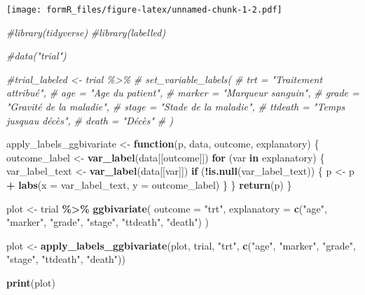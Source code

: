 \documentclass[
]{article}
\newenvironment{Shaded}{\begin{snugshade}}{\end{snugshade}}
\newcommand{\AttributeTok}[1]{\textcolor[rgb]{0.13,0.29,0.53}{#1}}
\newcommand{\CommentTok}[1]{\textcolor[rgb]{0.56,0.35,0.01}{\textit{#1}}}
\newcommand{\ControlFlowTok}[1]{\textcolor[rgb]{0.13,0.29,0.53}{\textbf{#1}}}
\newcommand{\FunctionTok}[1]{\textcolor[rgb]{0.13,0.29,0.53}{\textbf{#1}}}
\newcommand{\NormalTok}[1]{#1}
\newcommand{\OtherTok}[1]{\textcolor[rgb]{0.56,0.35,0.01}{#1}}
\newcommand{\SpecialCharTok}[1]{\textcolor[rgb]{0.81,0.36,0.00}{\textbf{#1}}}
\newcommand{\StringTok}[1]{\textcolor[rgb]{0.31,0.60,0.02}{#1}}
\begin{document}
\texttt{[image: formR\_files/figure-latex/unnamed-chunk-1-2.pdf]}

\begin{Shaded}
\begin{Highlighting}[]
\CommentTok{\#library(tidyverse)}
\CommentTok{\#library(labelled)}

\CommentTok{\#data("trial")}

\CommentTok{\#trial\_labeled \textless{}{-} trial \%\textgreater{}\%}
\CommentTok{\#  set\_variable\_labels(}
\CommentTok{\#    trt = "Traitement attribué",}
\CommentTok{\#    age = "Age du patient",}
\CommentTok{\#    marker = "Marqueur sanguin",}
\CommentTok{\#    grade = "Gravité de la maladie",}
\CommentTok{\#    stage = "Stade de la maladie",}
\CommentTok{\#    ttdeath = "Temps jusqu\textquotesingle{}au décès",}
\CommentTok{\#    death = "Décès"}
\CommentTok{\#  )}

\NormalTok{apply\_labels\_ggbivariate }\OtherTok{\textless{}{-}} \ControlFlowTok{function}\NormalTok{(p, data, outcome, explanatory) \{}
\NormalTok{  outcome\_label }\OtherTok{\textless{}{-}} \FunctionTok{var\_label}\NormalTok{(data[[outcome]])}
  \ControlFlowTok{for}\NormalTok{ (var }\ControlFlowTok{in}\NormalTok{ explanatory) \{}
\NormalTok{    var\_label\_text }\OtherTok{\textless{}{-}} \FunctionTok{var\_label}\NormalTok{(data[[var]])}
    \ControlFlowTok{if}\NormalTok{ (}\SpecialCharTok{!}\FunctionTok{is.null}\NormalTok{(var\_label\_text)) \{}
\NormalTok{      p }\OtherTok{\textless{}{-}}\NormalTok{ p }\SpecialCharTok{+} \FunctionTok{labs}\NormalTok{(}\AttributeTok{x =}\NormalTok{ var\_label\_text, }\AttributeTok{y =}\NormalTok{ outcome\_label)}
\NormalTok{    \}}
\NormalTok{  \}}
  \FunctionTok{return}\NormalTok{(p)}
\NormalTok{\}}

\NormalTok{plot }\OtherTok{\textless{}{-}}\NormalTok{ trial }\SpecialCharTok{\%\textgreater{}\%}
  \FunctionTok{ggbivariate}\NormalTok{(}
    \AttributeTok{outcome =} \StringTok{"trt"}\NormalTok{,}
    \AttributeTok{explanatory =} \FunctionTok{c}\NormalTok{(}\StringTok{"age"}\NormalTok{, }\StringTok{"marker"}\NormalTok{, }\StringTok{"grade"}\NormalTok{, }\StringTok{"stage"}\NormalTok{, }\StringTok{"ttdeath"}\NormalTok{, }\StringTok{"death"}\NormalTok{)}
\NormalTok{  )}

\NormalTok{plot }\OtherTok{\textless{}{-}} \FunctionTok{apply\_labels\_ggbivariate}\NormalTok{(plot, trial, }\StringTok{"trt"}\NormalTok{, }\FunctionTok{c}\NormalTok{(}\StringTok{"age"}\NormalTok{, }\StringTok{"marker"}\NormalTok{, }\StringTok{"grade"}\NormalTok{, }\StringTok{"stage"}\NormalTok{, }\StringTok{"ttdeath"}\NormalTok{, }\StringTok{"death"}\NormalTok{))}

\FunctionTok{print}\NormalTok{(plot)}
\end{Highlighting}
\end{Shaded}
\end{document}
